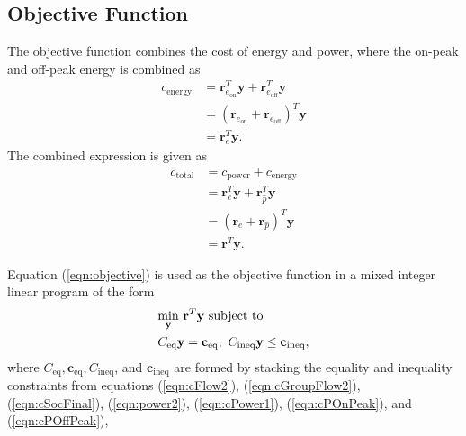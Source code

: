 \subsection{Objective Function}
The objective function combines the cost of energy and power, where the on-peak and off-peak energy is combined as 
\begin{equation}\label{eqn:cEnergy2}
	\begin{aligned}
		c_{\text{energy}} &= \mathbf{r}_{e_\text{on}}^T\mathbf{y} + \mathbf{r}_{e_\text{off}}^T\mathbf{y} \\
		&=\left ( \mathbf{r}_{e_\text{on}} + \mathbf{r}_{e_\text{off}} \right )^T \mathbf{y} \\
		&= \mathbf{r}_e^T\mathbf{y}.
	\end{aligned}
\end{equation}
The combined expression is given as 
\begin{equation}\label{eqn:objective}
	\begin{aligned}
		c_{\text{total}} &= c_{\text{power}} + c_{\text{energy}} \\ 
				 &= \mathbf{r}_e^T\mathbf{y} + \mathbf{r}_{\hat{p}}^T\mathbf{y} \\
				 &= \left ( \mathbf{r}_e + \mathbf{r}_{\hat{p}} \right )^T\mathbf{y} \\
				 &= \mathbf{r}^T\mathbf{y}.
	\end{aligned}
\end{equation}
\par Equation (\ref{eqn:objective}) is used as the objective function in a mixed integer linear program of the form
\begin{equation}
	\begin{aligned}
		& \underset{\mathbf{y}}{\scalebox{1}{\text{min}}} \ \mathbf{r}^T\mathbf{y} \ \text{subject to}\\
		& C_{\text{eq}}\mathbf{y} = \mathbf{c}_{\text{eq}}, \ C_{\text{ineq}}\mathbf{y} \le \mathbf{c}_{\text{ineq}},
	\end{aligned}
\end{equation}
where $C_{\text{eq}}, \mathbf{c}_{\text{eq}}, C_{\text{ineq}}$, and $\mathbf{c}_{\text{ineq}}$ are formed by stacking the equality and inequality constraints from equations (\ref{eqn:cFlow2}), (\ref{eqn:cGroupFlow2}), (\ref{eqn:cSocFinal}), (\ref{eqn:power2}), (\ref{eqn:cPower1}), (\ref{eqn:cPOnPeak}), and (\ref{eqn:cPOffPeak}),
